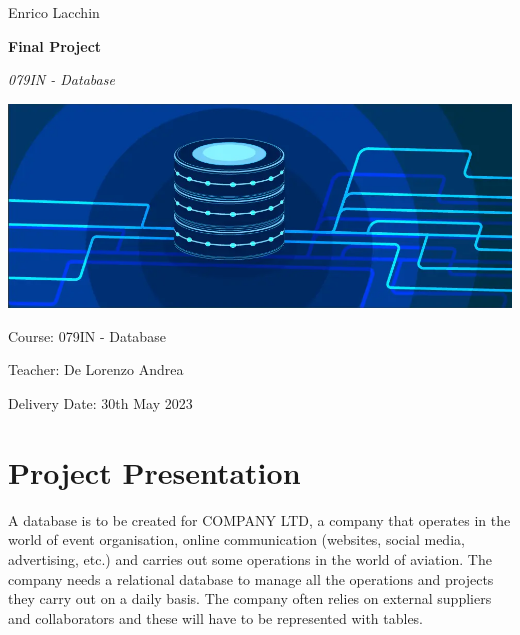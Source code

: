 \documentclass[12pt,a4paper]{article}
\begin{document}

\small{Enrico Lacchin}

\MidSep
\textbf{\LARGE{Final Project}}

\MidSep
\textit{\Large{079IN - Database}}
\Sep

\begin{center}
\includegraphics[width=1\columnwidth]{../../img/db}
\end{center}

\vfill
Course: 079IN - Database

Teacher: De Lorenzo Andrea

Delivery Date: 30th May 2023


\clearpage
{}
\setcounter{page}{1}
\tableofcontents

\clearpage

\setcounter{page}{1}

\section{Project Presentation}\label{sec:project-presentation}
A database is to be created for COMPANY LTD, a company that operates in the world of event organisation, online communication (websites, social media, advertising, etc.) and carries out some operations in the world of aviation.
The company needs a relational database to manage all the operations and projects they carry out on a daily basis.
The company often relies on external suppliers and collaborators and these will have to be represented with tables.
\end{document}
